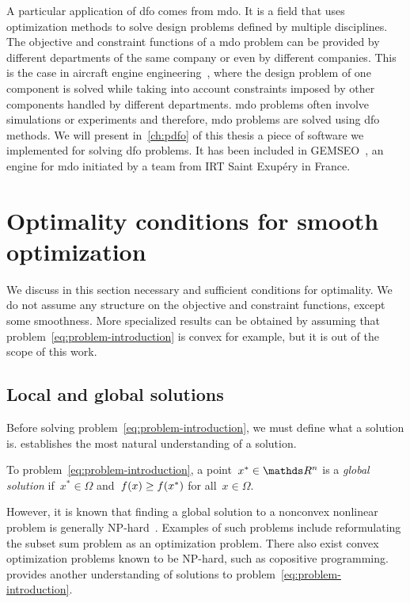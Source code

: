 A particular application of \gls{dfo} comes from \gls{mdo}.
It is a field that uses optimization methods to solve design problems defined by multiple disciplines.
The objective and constraint functions of a \gls{mdo} problem can be provided by different departments of the same company or even by different companies.
This is the case in aircraft engine engineering~\cite{Gazaix_Etal_2019}, where the design problem of one component is solved while taking into account constraints imposed by other components handled by different departments.
\Gls{mdo} problems often involve simulations or experiments and therefore, \gls{mdo} problems are solved using \gls{dfo} methods.
We will present in~\cref{ch:pdfo} of this thesis a piece of software we implemented for solving \gls{dfo} problems.
It has been included in GEMSEO~\cite{Gallard_Etal_2018}, an engine for \gls{mdo} initiated by a team from IRT Saint Exup{\'{e}}ry in France.

\section{Optimality conditions for smooth optimization}

We discuss in this section necessary and sufficient conditions for optimality.
We do not assume any structure on the objective and constraint functions, except some smoothness.
More specialized results can be obtained by assuming that problem~\cref{eq:problem-introduction} is convex for example, but it is out of the scope of this work.

\subsection{Local and global solutions}

Before solving problem~\cref{eq:problem-introduction}, we must define what a solution is.
 establishes the most natural understanding of a solution.

\begin{definition}
    \label{def:global-solution}
    To problem~\cref{eq:problem-introduction}, a point~$x^{\ast} \in \R^n$ is a \emph{global solution} if~$x^{\ast} \in \Omega$ and~$f(x) \ge f(x^{\ast})$ for all~$x \in \Omega$.
\end{definition}

However, it is known that finding a global solution to a nonconvex nonlinear problem is generally NP-hard~\cite{Murty_Kabadi_1987}.
Examples of such problems include reformulating the subset sum problem as an optimization problem.
There also exist convex optimization problems known to be NP-hard, such as copositive programming.
 provides another understanding of solutions to problem~\cref{eq:problem-introduction}.

